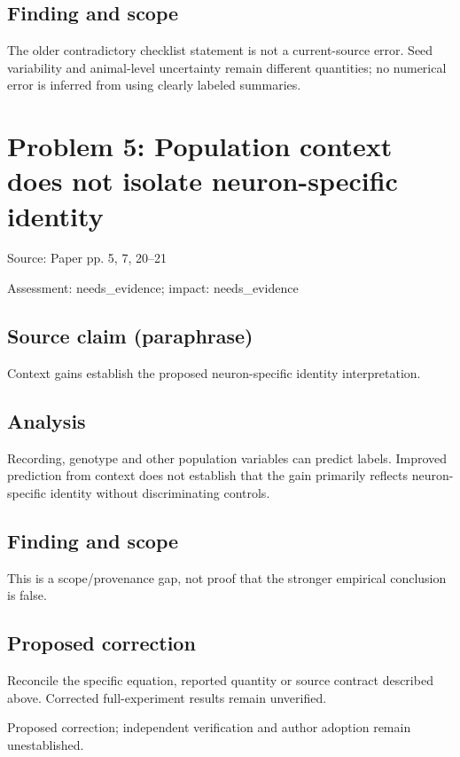 \documentclass[11pt]{article}
\begin{document}
\subsection*{Finding and scope}

The older contradictory checklist statement is not a current-source error. Seed variability and animal-level uncertainty remain different quantities; no numerical error is inferred from using clearly labeled summaries.

\section*{Problem 5: Population context does not isolate neuron-specific identity}

Source: Paper pp. 5, 7, 20–21

Assessment: needs\_evidence; impact: needs\_evidence

\subsection*{Source claim (paraphrase)}

Context gains establish the proposed neuron-specific identity interpretation.

\subsection*{Analysis}

Recording, genotype and other population variables can predict labels. Improved prediction from context does not establish that the gain primarily reflects neuron-specific identity without discriminating controls.

\subsection*{Finding and scope}

This is a scope/provenance gap, not proof that the stronger empirical conclusion is false.

\subsection*{Proposed correction}

Reconcile the specific equation, reported quantity or source contract described above. Corrected full-experiment results remain unverified.

Proposed correction; independent verification and author adoption remain unestablished.
\end{document}
